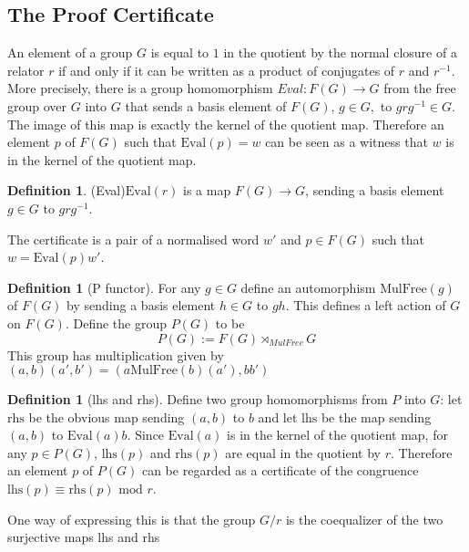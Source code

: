 \documentclass[11pt]{article} %
\theoremstyle{definition}
\theoremstyle{definition}
\theoremstyle{definition}
\theoremstyle{definition}
\theoremstyle{definition}
\newtheorem{defn}[theorem]{Definition}
\theoremstyle{definition}
\newtheorem{subdef}{Definition}[theorem]
\begin{document}
\subsection{The Proof Certificate}\label{proofcert}

An element of a group $G$ is equal to $1$ in the quotient by the normal closure
of a relator $r$ if and only if it can be written as a product of conjugates of $r$ and $r^{-1}$.
More precisely, there is a group homomorphism $\textit{Eval}: F(G) \to G$ from the free group
over $G$ into $G$ that sends a basis element of $F(G)$,
$g \in G,$ to $grg^{-1} \in G$. The image of this map is exactly the kernel of the quotient map.
Therefore an element $p$ of $F(G)$ such that $\text{Eval}(p) = w$
can be seen as a witness that $w$ is in the kernel of the quotient map.

\begin{defn}(Eval)\label{Eval}
  $\text{Eval}(r)$ is a map $F(G) \to G$, sending a basis element $g \in G$ to $grg^{-1}$.
\end{defn}

The certificate is a pair of a normalised word $w'$ and
$p \in F(G)$ such that $w = \text{Eval}(p) w'$.

\begin{defn}[P functor]
  For any $g \in G$ define an automorphism $\text{MulFree}(g)$ of $F(G)$ by sending a basis
  element $h \in G$ to $gh$. This defines a left action of $G$ on $F(G)$.
  Define the group $P(G)$ to be
  \begin{equation}
  P(G) := F(G) \rtimes_{MulFree} G
  \end{equation}
  This group has multiplication given by $(a, b) (a', b') = (a \text{MulFree}(b)(a'), bb')$
\end{defn}

\begin{subdef}[lhs and rhs]
Define two group homomorphisms from $P$ into $G$: let
$\text{rhs}$ be the obvious map sending $(a, b)$ to $b$ and let
$\text{lhs}$ be the map sending $(a,b)$ to $\text{Eval}(a)b$.
Since $\text{Eval}(a)$ is in the kernel of the quotient map,
for any $p\in P(G)$, $\text{lhs}(p)$ and $\text{rhs}(p)$ are equal in the quotient by $r$.
Therefore an element $p$ of $P(G)$ can be regarded as a certificate of the congruence
$\text{lhs}(p) \equiv \text{rhs}(p) \text{ mod } r$.
\end{subdef}

One way of expressing this is that the group $G / r$ is the coequalizer of
the two surjective maps lhs and rhs
\end{document}
